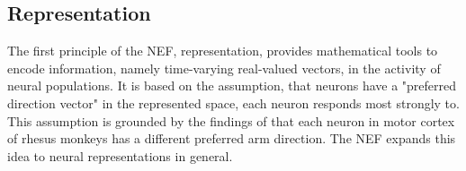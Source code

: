 \subsection{Representation}
\label{subsec:nef_representation}
The first principle of the \ac{NEF}, representation, provides mathematical tools to encode information, namely time-varying real-valued vectors, in the activity of neural populations.
It is based on the assumption, that neurons have a "preferred direction vector" in the represented space, each neuron responds most strongly to.
This assumption is grounded by the findings of \cite{Georgopoulos1989} that each neuron in motor cortex of rhesus monkeys has a different preferred arm direction.
The \ac{NEF} expands this idea to neural representations in general.
\begin{figure}[t!]
	\centering
	\\
	\vspace{-0.4cm}
\end{figure}
